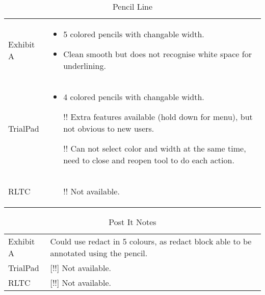 \begin{center}
\begin{table}[htbp]

\label{tab:PencilLine}    
\caption{Pencil Line}
\centering
\begin{tabular}{|p{}|p{}|}
\hline
\rowcolor{lightgrey}\multicolumn{2}{|c|}{Pencil Line}\\
\hline
Exhibit A &
 \begin{itemize}
	\item 5 colored pencils with changable width.
	\item Clean smooth but does not recognise white space for underlining.
 \end{itemize}\\
\hline
TrialPad & 
 \begin{itemize}
	\item 4 colored pencils with changable width.
	\item [\color{amber}!!]\color{black}Extra features available (hold down for menu), but not obvious to new users.
	\item [\color{amber}!!]\color{black}Can not select color and width at the same time, need to close and reopen tool to do each action.
 \end{itemize}\\
\hline
RLTC & 
\begin{itemize}
  \item [\color{amber}!!]\color{black} Not available.
\end{itemize}\\
\hline

\end{tabular}
\end{table}
\end{center}

\begin{center}
\begin{table}[htbp]

\label{tab:PostItNotes}    
\caption{Post It Notes}
\centering
\begin{tabular}{|p{}|p{}|}
\hline
\rowcolor{lightgrey}\multicolumn{2}{|c|}{Post It Notes}\\
\hline
Exhibit A & Could use redact in 5 colours, as redact block able to be annotated using the pencil.\\
\hline
TrialPad & [\color{amber}!!]\color{black} Not available.\\
\hline
RLTC & [\color{amber}!!]\color{black} Not available.\\
\hline
\end{tabular}
\end{table}
\end{center}

